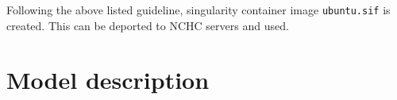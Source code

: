 Following the above listed guideline, singularity container image \texttt{ubuntu.sif} is created. This can be deported to NCHC servers and used. 


\section{Model description}
\label{sec:modDesc}

